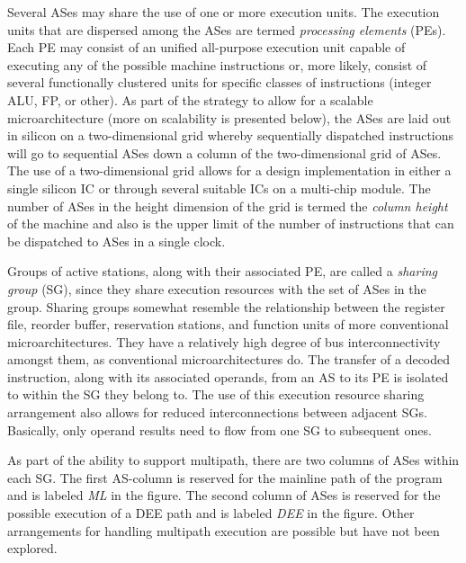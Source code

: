 \documentclass{book}
\begin{document}
Several ASes may share the use of one or more execution units.
The execution units that are dispersed among the ASes are termed
\textit{processing elements} (PEs).  Each PE 
may consist of an unified all-purpose execution unit capable of
executing any of the possible machine instructions or, more likely,
consist of
several functionally clustered units
for specific classes of instructions (integer ALU, FP, or other).
As part of the strategy to allow for a scalable microarchitecture
(more on scalability is presented below),
the ASes are laid out in silicon on
a two-dimensional grid whereby sequentially
dispatched instructions will go to sequential ASes down a column of
the two-dimensional grid of ASes.  
The use of a two-dimensional
grid allows for a design implementation
in either a single silicon IC or through several
suitable ICs on a multi-chip module.
The number of ASes in the height dimension of the grid is termed
the \textit{column height} of the machine and also is the upper limit
of the number of instructions that can be dispatched to ASes
in a single clock.

Groups of active stations, along with their associated PE,
are called a \textit{sharing group} (SG), since they share
execution resources with the set of ASes in the group.
Sharing groups somewhat resemble
the relationship between the register file, reorder buffer,
reservation stations, and function units of more conventional
microarchitectures.  They have a relatively high degree of bus
interconnectivity amongst them, as conventional microarchitectures do.
The transfer of a decoded instruction, along with its associated operands,
from an AS to its PE is isolated to within the SG they belong to.
The use of this execution resource sharing arrangement also allows
for reduced interconnections between adjacent SGs.
Basically, only operand results need to flow from one SG
to subsequent ones.

As part of the ability to support multipath,
there are two columns of ASes within each SG.
The first AS-column is
reserved for the mainline
path of the program and is
labeled \textit{ML} in the figure.
The second column of ASes is reserved for the possible
execution of a DEE path and is labeled \textit{DEE} in the figure.
Other arrangements for handling multipath execution are possible
but have not been explored.
\end{document}
